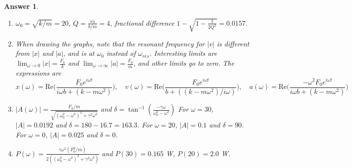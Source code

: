 \documentclass[a4paper]{article}
\newtheorem{ans}{Answer}[section]
\theoremstyle{new}
\begin{document}
\begin{ans}\leavevmode
\begin{enumerate}[label=(\alph*)]
\item $\omega_0=\sqrt{k/m}=20$, $Q=\frac{\omega_0}{b/m}=4$, fractional difference $1-\sqrt{1-\frac{1}{2Q^2}}=0.0157$.
\item When drawing the graphs, note that the resonant frequency for $|v|$ is different from $|x|$ and $|a|$, and is at $\omega_0$ instead of $\omega_{res}$. Interesting limits are $\lim_{\omega\rightarrow0}|x|=\frac{F_0}{k}$ and $\lim_{\omega\rightarrow\infty}|a|=\frac{F_0}{m}$, and other limits go to zero. The expressions are
$$x(\omega)=\text{Re}\bigg(\frac{F_0e^{i\omega t}}{i\omega b+(k-m\omega^2)}\bigg),\quad v(\omega)=\text{Re}\bigg(\frac{F_0e^{i\omega t}}{b+((k-m\omega^2)/i\omega)}\bigg),\quad a(\omega)=\text{Re}\bigg(\frac{-\omega^2F_0e^{i\omega t}}{i\omega b+(k-m\omega^2)}\bigg)$$
\begin{center}
\hspace{0.01cm}
\hspace{0.01cm}
\end{center}
\item $|A(\omega)|=\frac{F_0/m}{\sqrt{(\omega_0^2-\omega^2)^2+\gamma^2\omega^2}}$ and $\delta=\tan^{-1}(\frac{-\gamma\omega}{\omega_0^2-\omega^2})$ For $\omega=30$, $|A|=0.0192$ and $\delta=180-16.7=163.3$\degree. For $\omega=20$, $|A|=0.1$ and $\delta=90$\degree. For $\omega=0$, $|A|=0.025$ and $\delta=0$\degree.
\item $P(\omega)=\frac{\gamma\omega^2(F_0^2/m)}{2((\omega_0^2-\omega^2)^2+\gamma^2\omega^2)}$ and $P(30)=0.165$ W, $P(20)=2.0$ W.
\end{enumerate}
\end{ans}
\end{document}
